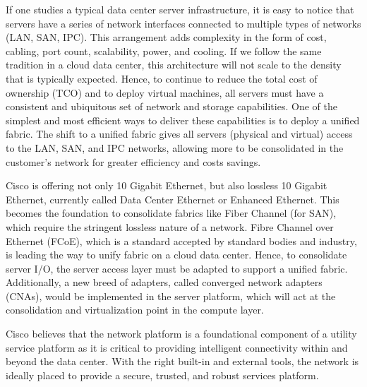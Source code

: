 
If one studies a typical data center server infrastructure, it is easy to notice that servers have a series of network interfaces connected to multiple types of networks (LAN, SAN, IPC). This arrangement adds complexity in the form of cost, cabling, port count, scalability, power, and cooling. If we follow the same tradition in a cloud data center, this architecture will not scale to the density that is typically expected. Hence, to continue to reduce the total cost of ownership (TCO) and to deploy virtual machines, all servers must have a consistent and ubiquitous set of network and storage capabilities. One of the simplest and most efficient ways to deliver these capabilities is to deploy a unified fabric. The shift to a unified fabric gives all servers (physical and virtual) access to the LAN, SAN, and IPC networks, allowing more to be consolidated in the customer’s network for greater efficiency and costs savings.

Cisco is offering not only 10 Gigabit Ethernet, but also lossless 10 Gigabit Ethernet, currently called Data Center Ethernet or Enhanced Ethernet. This becomes the foundation to consolidate fabrics like Fiber Channel (for SAN), which require the stringent lossless nature of a network. Fibre Channel over Ethernet (FCoE), which is a standard accepted by standard bodies and industry, is leading the way to unify fabric on a cloud data center. Hence, to consolidate server I/O, the server access layer must be adapted to support a unified fabric. Additionally, a new breed of adapters, called converged network adapters (CNAs), would be implemented in the server platform, which will act at the consolidation and virtualization point in the compute layer.


Cisco believes that the network platform is a foundational component of a utility service platform as it is critical to providing intelligent connectivity within and beyond the data center. With the right built-in and external tools, the network is ideally placed to provide a secure, trusted, and robust services platform.

